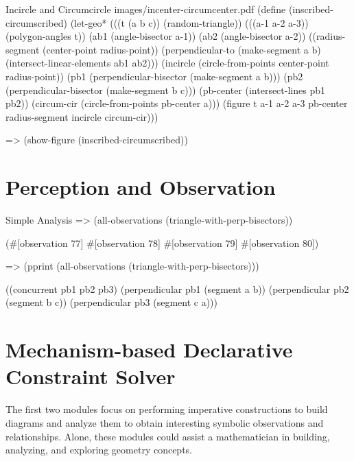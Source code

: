 \begin{pdf-example}
[label=incircle-circumcircle-fig]
{Incircle and Circumcircle}
{images/incenter-circumcenter.pdf}
(define (inscribed-circumscribed)
  (let-geo* (((t (a b c)) (random-triangle))
             (((a-1 a-2 a-3)) (polygon-angles t))
             (ab1 (angle-bisector a-1))
             (ab2 (angle-bisector a-2))
             ((radius-segment (center-point radius-point))
              (perpendicular-to (make-segment a b)
                                (intersect-linear-elements ab1 ab2)))
             (incircle (circle-from-points
                        center-point
                        radius-point))
             (pb1 (perpendicular-bisector
                   (make-segment a b)))
             (pb2 (perpendicular-bisector
                   (make-segment b c)))
             (pb-center (intersect-lines pb1 pb2))
             (circum-cir (circle-from-points
                          pb-center
                          a)))
    (figure t a-1 a-2 a-3
            pb-center
            radius-segment
            incircle
            circum-cir)))

=> (show-figure (inscribed-circumscribed))
\end{pdf-example}

\section{Perception and Observation}

\begin{repl-example}{Simple Analysis}
=> (all-observations (triangle-with-perp-bisectors))

(#[observation 77] #[observation 78] #[observation 79] #[observation 80])

=> (pprint (all-observations (triangle-with-perp-bisectors)))

((concurrent pb1 pb2 pb3)
 (perpendicular pb1 (segment a b))
 (perpendicular pb2 (segment b c))
 (perpendicular pb3 (segment c a)))
\end{repl-example}

\section{Mechanism-based Declarative Constraint Solver}

The first two modules focus on performing imperative constructions to
build diagrams and analyze them to obtain interesting symbolic
observations and relationships. Alone, these modules could assist a
mathematician in building, analyzing, and exploring geometry
concepts.


